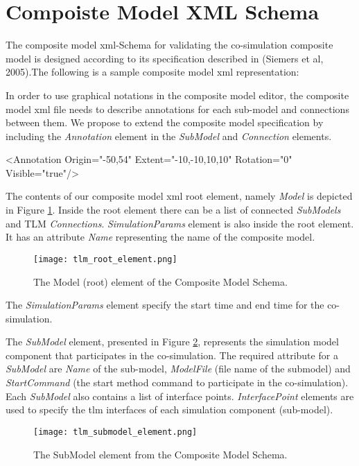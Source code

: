 \section{Compoiste Model XML Schema}
\label{sec:tlmschema}

The composite model \acrshort{xml}-Schema for validating the co-simulation composite model is designed according
to its specification described in (Siemers et al, 2005).The following is a sample composite model \acrshort{xml} representation:



In order to use graphical notations in the composite model editor, the composite model \acrshort{xml} file needs to describe annotations for each sub-model and connections between them. We propose to extend the composite model specification by including the \textit{Annotation}  element in the \textit{SubModel} and \textit{Connection} elements.

<Annotation Origin="{-50,54}" Extent="{-10,-10,10,10}" Rotation="0" Visible="true"/>

The contents of our composite model \acrshort{xml} root element, namely \textit{Model} is depicted in Figure \ref{fig:tlmerootelement}. Inside the root element there can be a list of connected \textit{SubModels} and TLM \textit{Connections}. \textit{SimulationParams} element is also inside the root element. It has an attribute \textit{Name} representing the name of the composite model.

\begin{figure}
	\texttt{[image: tlm\_root\_element.png]}
	\caption{The Model (root) element of the Composite Model Schema.}
	\label{fig:tlmerootelement}
\end{figure}


The \textit{SimulationParams} element specify the start time and end time for the co-simulation.

The \textit{SubModel} element, presented in Figure \ref{fig:tlmsubmodelelement}, represents the simulation model component that participates in the co-simulation. The required attribute for a \textit{SubModel} are \textit{Name} of the sub-model, \textit{ModelFile} (file name of the submodel) and \textit{StartCommand} (the start method command to participate in the co-simulation). Each \textit{SubModel} also contains a list of interface points. \textit{InterfacePoint} elements are used to specify the \acrshort{tlm} interfaces of each simulation component (sub-model). 

\begin{figure}
	\texttt{[image: tlm\_submodel\_element.png]}
	\caption{The SubModel element from the Composite Model Schema.}
	\label{fig:tlmsubmodelelement}
\end{figure}


